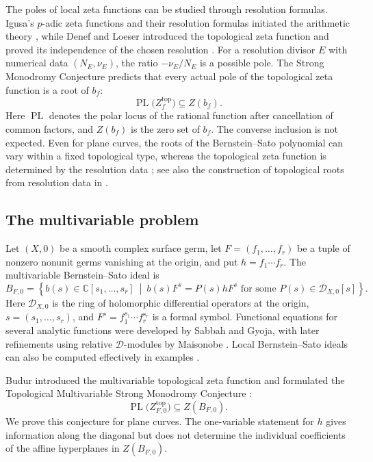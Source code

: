\documentclass[12pt]{amsart}
\numberwithin{equation}{section}
\theoremstyle{plain}
\theoremstyle{definition}
\theoremstyle{remark}
\theoremstyle{definition}
\DeclareMathOperator{\PL}{PL}
\newcommand{\C}{\mathbb C}
\newcommand{\D}{\mathscr D}
\begin{document}
The poles of local zeta functions can be studied through resolution formulas. Igusa's $p$-adic zeta functions and their resolution formulas initiated the arithmetic theory \cite{Igusa2000,Denef1991}, while Denef and Loeser introduced the topological zeta function and proved its independence of the chosen resolution \cite{DenefLoeser1992}. For a resolution divisor $E$ with numerical data $(N_E,\nu_E)$, the ratio $-\nu_E/N_E$ is a possible pole. The Strong Monodromy Conjecture predicts that every actual pole of the topological zeta function is a root of $b_f$:
\[
\PL\bigl(Z_f^{\mathrm{top}}\bigr)\subseteq Z(b_f).
\]
Here $\PL$ denotes the polar locus of the rational function after cancellation of common factors, and $Z(b_f)$ is the zero set of $b_f$. The converse inclusion is not expected. Even for plane curves, the roots of the Bernstein--Sato polynomial can vary within a fixed topological type, whereas the topological zeta function is determined by the resolution data \cite[Example~1]{Oaku2022}; see also the construction of topological roots from resolution data in \cite{Blanco2026}.

\subsection{The multivariable problem}

Let $(X,0)$ be a smooth complex surface germ, let $F=(f_1,\ldots,f_r)$ be a tuple of nonzero nonunit germs vanishing at the origin, and put $h=f_1\cdots f_r$. The multivariable Bernstein--Sato ideal is
\[
B_{F,0}=\left\{b(s)\in\C[s_1,\ldots,s_r]\ \middle|\ b(s)F^s=P(s)hF^s\text{ for some }P(s)\in\D_{X,0}[s]\right\}.
\]
Here $\D_{X,0}$ is the ring of holomorphic differential operators at the origin, $s=(s_1,\ldots,s_r)$, and $F^s=f_1^{s_1}\cdots f_r^{s_r}$ is a formal symbol. Functional equations for several analytic functions were developed by Sabbah and Gyoja, with later refinements using relative $\D$-modules by Maisonobe \cite{Sabbah1987,Gyoja1993,Maisonobe2023}. Local Bernstein--Sato ideals can also be computed effectively in examples \cite{UchaCastro2004,BahloulOaku2010}.

Budur introduced the multivariable topological zeta function and formulated the Topological Multivariable Strong Monodromy Conjecture \cite[Conjecture~1.17]{Budur2015}:
\[
\PL\bigl(Z^{\mathrm{top}}_{F,0}\bigr)\subseteq Z(B_{F,0}).
\]
We prove this conjecture for plane curves. The one-variable statement for $h$ gives information along the diagonal but does not determine the individual coefficients of the affine hyperplanes in $Z(B_{F,0})$.
\end{document}
